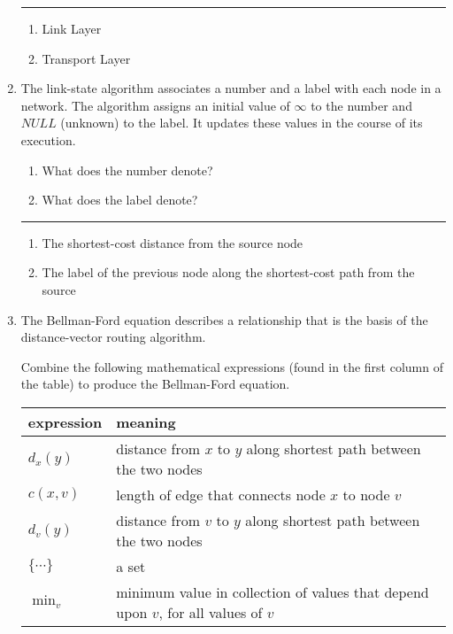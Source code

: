 \documentclass[twoside]{article}
\newenvironment{answer}
  {\vspace*{0.2cm} \rule{12cm}{0.04cm} \vspace*{0.2cm}}
  {\vspace*{0.2cm}}
\begin{document}
\begin{enumerate}
  \begin{answer}

  \begin{enumerate}
    \item Link Layer
    \item Transport Layer
    \end{enumerate}

    \end{answer}

  \item The link-state algorithm associates a number and a label with
    each node in a network. The algorithm assigns an initial value
    of $\infty$ to the number and $NULL$ (unknown) to the label.
    It updates these values in the course of its execution.
  \begin{enumerate}
    \item What does the number denote?
    \item What does the label denote?
    \end{enumerate}
  
  \begin{answer}

  \begin{enumerate}
    \item The shortest-cost distance from the source node
    \item The label of the previous node along the shortest-cost path from the source
    \end{enumerate}

    \end{answer}

  \item The Bellman-Ford equation describes a relationship that
    is the basis of the distance-vector routing algorithm.

    Combine the following mathematical expressions
    (found in the first column of the table) to produce the Bellman-Ford equation.

  \begin{tabular}{ll}
    \textbf{expression} & \textbf{meaning} \\ \hline
    $d_x(y)$ & distance from $x$ to $y$ along shortest path between the two nodes\\
    $c(x,v)$ & length of edge that connects node $x$ to node $v$ \\
    $d_v(y)$ & distance from $v$ to $y$ along shortest path between the two nodes \\
    $\{ \cdots \}$ & a set \\
    ${\min}_v$ & \parbox[t]{10cm}{minimum value in collection of values that
      depend upon $v$, for all values of $v$}
    \end{tabular}


\end{enumerate}
\end{document}
